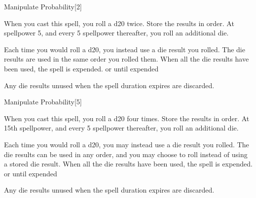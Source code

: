 \begin{spellsection}[Lesser]{Manipulate Probability}[2]
    \begin{spellheader}
    \end{spellheader}
    \begin{spellcontent}
        \begin{spelltargetinginfo}
        \end{spelltargetinginfo}
        \begin{spelleffects}
            \spelleffect When you cast this spell, you roll a d20 twice. Store the results in order. At spellpower 5, and every 5 spellpower thereafter, you roll an additional die.

            Each time you would roll a d20, you instead use a die result you rolled. The die results are used in the same order you rolled them. When all the die results have been used, the spell is expended.
            \spelldur \durshort or until expended
        \end{spelleffects}
    \end{spellcontent}
    \begin{spellfooter}
        \spellnotes Any die results unused when the spell duration expires are discarded.
        \miscastexplode
    \end{spellfooter}
\end{spellsection}

\begin{spellsection}{Manipulate Probability}[5]
    \begin{spellheader}
    \end{spellheader}
    \begin{spellcontent}
        \begin{spelltargetinginfo}
        \end{spelltargetinginfo}
        \begin{spelleffects}
            \spelleffect When you cast this spell, you roll a d20 four times. Store the results in order. At 15th spellpower, and every 5 spellpower thereafter, you roll an additional die.

            Each time you would roll a d20, you may instead use a die result you rolled. The die results can be used in any order, and you may choose to roll instead of using a stored die result. When all the die results have been used, the spell is expended.
            \spelldur \durshort or until expended
        \end{spelleffects}
    \end{spellcontent}
    \begin{spellfooter}
        \spellnotes Any die results unused when the spell duration expires are discarded.
        \miscastexplode
    \end{spellfooter}
\end{spellsection}

